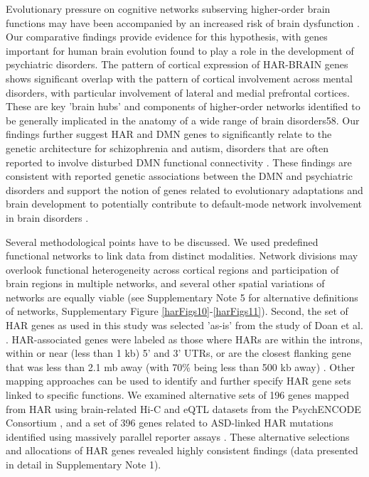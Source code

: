 \begin{refsection}
Evolutionary pressure on cognitive networks subserving higher-order brain functions may have been accompanied by an increased risk of brain dysfunction \citep{crow1997schizophrenia,Heuvel2019EvolutionaryMI}. Our comparative findings provide evidence for this hypothesis, with genes important for human brain evolution found to play a role in the development of psychiatric disorders. The pattern of cortical expression of HAR-BRAIN genes shows significant overlap with the pattern of cortical involvement across mental disorders, with particular involvement of lateral and medial prefrontal cortices. These are key 'brain hubs' and components of higher-order networks identified to be generally implicated in the anatomy of a wide range of brain disorders58. Our findings further suggest HAR and DMN genes to significantly relate to the genetic architecture for schizophrenia and autism, disorders that are often reported to involve disturbed DMN functional connectivity \citep{padmanabhan2017default,Lange2019SharedVF}. These findings are consistent with reported genetic associations between the DMN and psychiatric disorders \citep{meda2014multivariate} and support the notion of genes related to evolutionary adaptations and brain development to potentially contribute to default-mode network involvement in brain disorders \citep{meda2014multivariate}.

Several methodological points have to be discussed. We used predefined functional networks to link data from distinct modalities. Network divisions may overlook functional heterogeneity across cortical regions and participation of brain regions in multiple networks, and several other spatial variations of networks are equally viable \citep{smith2009correspondence} (see Supplementary Note 5 for alternative definitions of networks, Supplementary Figure \ref{harFigs10}-\ref{harFigs11}). Second, the set of HAR genes as used in this study was selected 'as-is' from the study of Doan et al. \citep{doan2016mutations}. HAR-associated genes were labeled as those where HARs are within the introns, within or near (less than 1 kb) 5' and 3' UTRs, or are the closest flanking gene that was less than 2.1 mb away (with 70\% being less than 500 kb away) \citep{doan2016mutations}. Other mapping approaches can be used to identify and further specify HAR gene sets linked to specific functions. We examined alternative sets of 196 genes mapped from HAR using brain-related Hi-C and eQTL datasets from the PsychENCODE Consortium \citep{wang2018comprehensive}, and a set of 396 genes related to ASD-linked HAR mutations identified using massively parallel reporter assays \citep{doan2016mutations}. These alternative selections and allocations of HAR genes revealed highly consistent findings (data presented in detail in Supplementary Note 1).


\end{refsection}
